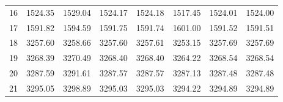 \documentclass[10pt,oneside]{article}
\begin{document}
\begin{table}[h!]
\begin{tabular}{cccccccc}
16 &   1524.35 & 1529.04 & 1524.17 & 1524.18 &      1517.45 & 1524.01 & 1524.00 \\
17 &   1591.82 & 1594.59 & 1591.75 & 1591.74 &      1601.00 & 1591.52 & 1591.51 \\
18 &   3257.60 & 3258.66 & 3257.60 & 3257.61 &      3253.15 & 3257.69 & 3257.69 \\
19 &   3268.39 & 3270.49 & 3268.40 & 3268.40 &      3264.22 & 3268.54 & 3268.54 \\
20 &   3287.59 & 3291.61 & 3287.57 & 3287.57 &      3287.13 & 3287.48 & 3287.48 \\
21 &   3295.05 & 3298.89 & 3295.03 & 3295.03 &      3294.22 & 3294.89 & 3294.89 \\
\bottomrule
\end{tabular}
\end{table}

\clearpage
\end{document}

